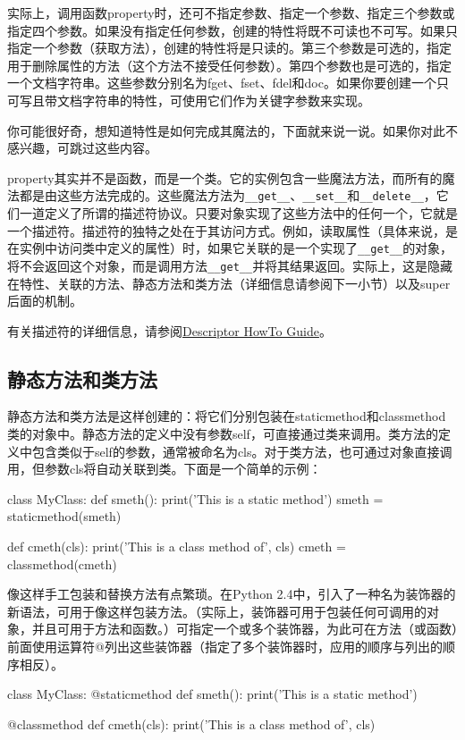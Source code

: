 实际上，调用函数property时，还可不指定参数、指定一个参数、指定三个参数或指定四个参数。如果没有指定任何参数，创建的特性将既不可读也不可写。如果只指定一个参数（获取方法），创建的特性将是只读的。第三个参数是可选的，指定用于删除属性的方法（这个方法不接受任何参数）。第四个参数也是可选的，指定一个文档字符串。这些参数分别名为fget、fset、fdel和doc。如果你要创建一个只可写且带文档字符串的特性，可使用它们作为关键字参数来实现。

\begin{tcolorbox}
你可能很好奇，想知道特性是如何完成其魔法的，下面就来说一说。如果你对此不感兴趣，可跳过这些内容。

property其实并不是函数，而是一个类。它的实例包含一些魔法方法，而所有的魔法都是由这些方法完成的。这些魔法方法为\verb|__get__|、\verb|__set__|和\verb|__delete__|，它们一道定义了所谓的描述符协议。只要对象实现了这些方法中的任何一个，它就是一个描述符。描述符的独特之处在于其访问方式。例如，读取属性（具体来说，是在实例中访问类中定义的属性）时，如果它关联的是一个实现了\verb|__get__|的对象，将不会返回这个对象，而是调用方法\verb|__get__|并将其结果返回。实际上，这是隐藏在特性、关联的方法、静态方法和类方法（详细信息请参阅下一小节）以及super后面的机制。

有关描述符的详细信息，请参阅\href{https://docs.python.org/3/howto/descriptor.html}{Descriptor HowTo Guide}。
\end{tcolorbox}
\subsection{静态方法和类方法}
静态方法和类方法是这样创建的：将它们分别包装在staticmethod和classmethod类的对象中。静态方法的定义中没有参数self，可直接通过类来调用。类方法的定义中包含类似于self的参数，通常被命名为cls。对于类方法，也可通过对象直接调用，但参数cls将自动关联到类。下面是一个简单的示例：
\begin{pyc}
class MyClass:
    def smeth():
        print('This is a static method')
    smeth = staticmethod(smeth)

    def cmeth(cls):
        print('This is a class method of', cls)
    cmeth = classmethod(cmeth)
\end{pyc}
像这样手工包装和替换方法有点繁琐。在Python 2.4中，引入了一种名为装饰器的新语法，可用于像这样包装方法。（实际上，装饰器可用于包装任何可调用的对象，并且可用于方法和函数。）可指定一个或多个装饰器，为此可在方法（或函数）前面使用运算符@列出这些装饰器（指定了多个装饰器时，应用的顺序与列出的顺序相反）。
\begin{pyc}
class MyClass:
    @staticmethod
    def smeth():
        print('This is a static method')

    @classmethod
    def cmeth(cls):
        print('This is a class method of', cls)
\end{pyc}

